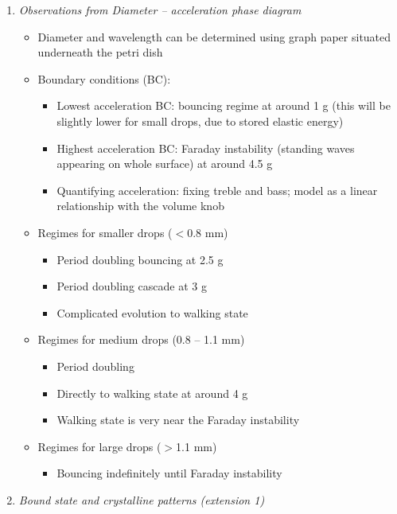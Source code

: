 \begin{enumerate}
\begin{enumerate}
\end{enumerate}


\item\textit{Observations from Diameter -- acceleration phase diagram \cite{protiere2006particle}}


\begin{itemize}

\item  Diameter and wavelength can be determined using graph paper situated underneath the petri dish

\item  Boundary conditions (BC):
\begin{itemize}
\item  Lowest acceleration BC: bouncing regime at around 1 g (this will be  slightly lower for small drops, due to stored elastic energy)
\item  Highest acceleration BC: Faraday instability (standing waves appearing on whole surface) at around 4.5 g
\item  Quantifying acceleration: fixing treble and bass; model as a linear relationship with the volume knob
\end{itemize}

\item  Regimes for smaller drops ($<$0.8 mm)
\begin{itemize}
\item  Period doubling bouncing at 2.5 g
\item  Period doubling cascade at 3 g
\item  Complicated evolution to walking state
\end{itemize}
\item  Regimes for medium drops (0.8 -- 1.1 mm)
\begin{itemize}
\item  Period doubling
\item  Directly to walking state at around 4 g
\item  Walking state is very near the Faraday instability
\end{itemize}
\item  Regimes for large drops ($>$1.1 mm)
\begin{itemize}
\item  Bouncing indefinitely until Faraday instability
\end{itemize}
\end{itemize}

\item \textit{Bound state and crystalline patterns (extension 1)}


\end{enumerate}
